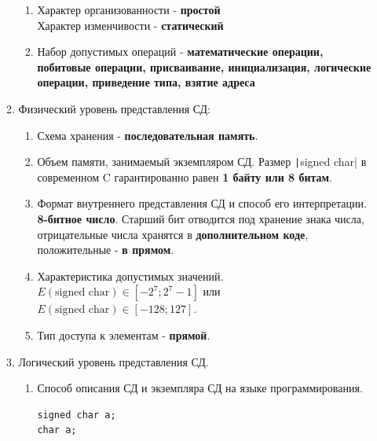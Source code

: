\documentclass[a4paper,14pt]{extarticle}
\begin{document}
\begin{enumerate}
\begin{enumerate}[label*=\arabic*.]
		            \begin{enumerate}[label*=\arabic*.]
			            \item Характер организованности - \textbf{простой}\\
			                  Характер изменчивости - \textbf{статический}
			            \item Набор допустимых операций - \textbf{математические операции, побитовые операции, присваивание, инициализация, логические операции,
				                  приведение типа, взятие адреса}
		            \end{enumerate}

		      \item Физический уровень представления СД:

		            \begin{enumerate}[label*=\arabic*.]
			            \item Схема хранения - \textbf{последовательная память}.
			            \item Объем памяти, занимаемый экземпляром СД.
			                  Размер \texttt|signed char| в современном C гарантированно равен \textbf{1 байту или 8 битам}.
			            \item Формат внутреннего представления СД и способ его интерпретации.
			                  \textbf{8-битное число}. Старший бит отводится под хранение знака числа, отрицательные числа
			                  хранятся в \textbf{дополнительном коде}, положительные - \textbf{в прямом}.
			            \item Характеристика допустимых значений.
			                  $E(\text{signed char}) \in [-2^7; 2^7 - 1]$ или
			                  $E(\text{signed char}) \in [-128; 127]$.
			            \item Тип доступа к элементам - \textbf{прямой}.
		            \end{enumerate}

		      \item Логический уровень представления СД.
		            \begin{enumerate}[label*=\arabic*.]
			            \item Способ описания СД и экземпляра СД на языке программирования.
			                  \begin{verbatim}
signed char a;
char a;
					  \end{verbatim}
		            \end{enumerate}
	      \end{enumerate}


\end{enumerate}
\end{document}
